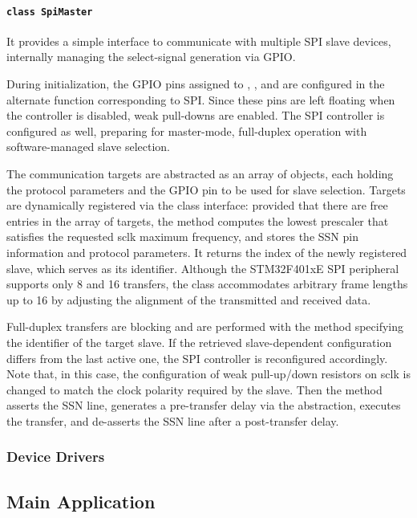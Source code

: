 \paragraph{\texttt{class SpiMaster}}

It provides a simple interface to communicate with multiple SPI slave devices, internally managing the select-signal generation via GPIO.

During initialization, the GPIO pins assigned to , , and  are configured in the alternate function corresponding to SPI. Since these pins are left floating when the controller is disabled, weak pull-downs are enabled. The SPI controller is configured as well, preparing for master-mode, full-duplex operation with software-managed slave selection.

The communication targets are abstracted as an array of  objects, each holding the protocol parameters and the GPIO pin to be used for slave selection. Targets are dynamically registered via the class interface: provided that there are free entries in the array of targets, the  method computes the lowest prescaler that satisfies the requested \ac{sclk} maximum frequency, and stores the SSN pin information and protocol parameters. It returns the index of the newly registered slave, which serves as its identifier. 
Although the STM32F401xE SPI peripheral supports only \qty{8}{\bit} and \qty{16}{\bit} transfers, the class accommodates arbitrary frame lengths up to \qty{16}{\bit} by adjusting the alignment of the transmitted and received data.

Full-duplex transfers are blocking and are performed with the  method specifying the identifier of the target slave. If the retrieved slave-dependent configuration differs from the last active one, the SPI controller is reconfigured accordingly. Note that, in this case, the configuration of weak pull-up/down resistors on \ac{sclk} is changed to match the clock polarity required by the slave. 
Then the method asserts the SSN line, generates a pre-transfer delay via the  abstraction, executes the transfer, and de-asserts the SSN line after a post-transfer delay. 

\subsubsection{Device Drivers}\label{ssubsec:cdev}

\subsection{Main Application}
